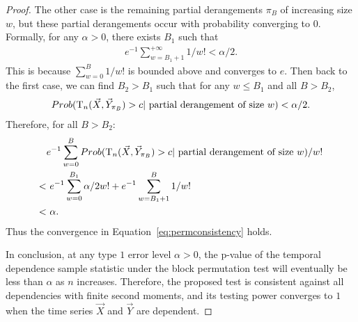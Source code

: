 \begin{proof}
The other case is the remaining partial derangements $\pi_{B}$ of increasing size $w$, but these partial derangements occur with probability converging to $0$. Formally, for any $\alpha > 0$, there exists $B_{1}$ such that 
\begin{align*}
e^{-1} \sum_{w=B_{1}+1}^{+\infty} 1/w! < \alpha / 2.
\end{align*}
This is because $\sum\limits_{w=0}^{B} 1/w!$ is bounded above and converges to $e$. Then back to the first case, we can find $B_{2}>B_{1}$ such that for any $w\leq B_{1}$ and all $B > B_{2}$,
\begin{align*}
 Prob(\mathrm{T}_{n}(\vec{X}, \vec{Y}_{\pi_B})  > c | \mbox{ partial derangement of size $w$}) < \alpha / 2.
\end{align*}
Therefore, for all $B > B_{2}$:
\begin{align*}
& e^{-1} \sum_{w=0}^{B} Prob(\mathrm{T}_{n}(\vec{X}, \vec{Y}_{\pi_B})  > c | \mbox{ partial derangement of size $w$}) /w!\\
< &\ e^{-1} \sum_{w=0}^{B_{1}} \alpha / 2 w! + e^{-1} \sum_{w=B_{1}+1}^{B} 1 / w!\\
< &\ \alpha.
\end{align*}
Thus the convergence in Equation~\ref{eq:permconsistency} holds.

In conclusion, at any type $1$ error level $\alpha>0$, the p-value of the temporal dependence sample statistic under the block permutation test will eventually be less than $\alpha$ as $n$ increases. Therefore, the proposed test is consistent against all dependencies with finite second moments, and its testing power converges to $1$ when the time series $\vec{X}$ and $\vec{Y}$ are dependent.
\end{proof}
